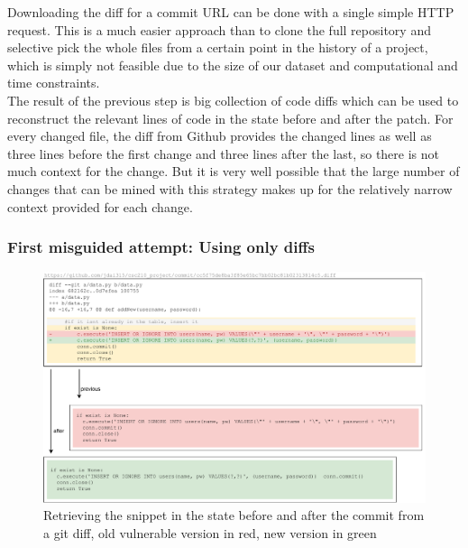 \documentclass[
a4paper,
pagesize,
pdftex,
12pt,
twoside, %
BCOR=5mm, %
ngerman,
fleqn,
final,
]{scrartcl}
\begin{document}
	Downloading the diff for a commit URL can be done with a single simple HTTP request. This is a much easier approach than to clone the full repository and selective pick the whole files from a certain point in the history of a project, which is simply not feasible due to the size of our dataset and computational and time constraints. \\
	The result of the previous step is big collection of code diffs which can be used to reconstruct the relevant lines of code in the state before and after the patch. For every changed file, the diff from Github provides the changed lines as well as three lines before the first change and three lines after the last, so there is not much context for the change. 
	But it is very well possible that the large number of changes that can be mined with this strategy makes up for the relatively narrow context provided for each change.\\
	\subsubsection{First misguided attempt: Using only diffs}
	
	\begin{figure}[ht]
		\centering
		\includegraphics[width=\linewidth]{img/GitCommitPreviousAfter}
		\caption{Retrieving the snippet in the state before and after the commit from a git diff, old vulnerable version in red, new version in green}
		\label{fig:gitdiff}
	\end{figure}
	
\end{document}
